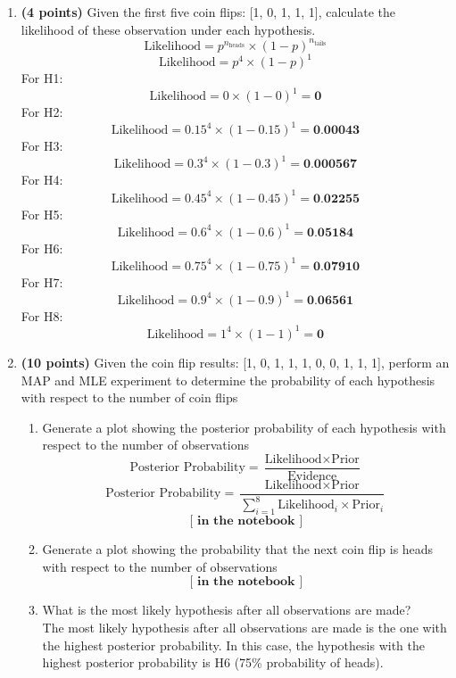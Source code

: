 \documentclass[a3paper,12pt]{extarticle} %
\begin{document}
    \begin{enumerate}
        \item \textbf{(4 points)} Given the first five coin flips: [1, 0, 1, 1, 1], calculate the likelihood of these observation
        under each hypothesis.
        \[
        \text{Likelihood} = p^{n_{\text{heads}}} \times (1-p)^{n_{\text{tails}}}
        \]
        \[
        \text{Likelihood} = p^{4} \times (1-p)^{1}
        \]
        For H1:
        \[
        \text{Likelihood} = 0 \times (1-0)^{1} = \textbf{0}
        \]
        For H2:
        \[
        \text{Likelihood} = 0.15^{4} \times (1-0.15)^{1} = \textbf{0.00043}
        \]
        For H3:
        \[
        \text{Likelihood} = 0.3^{4} \times (1-0.3)^{1} = \textbf{0.000567}
        \]
        For H4:
        \[
        \text{Likelihood} = 0.45^{4} \times (1-0.45)^{1} = \textbf{0.02255}
        \]
        For H5:
        \[
        \text{Likelihood} = 0.6^{4} \times (1-0.6)^{1} = \textbf{0.05184}
        \]
        For H6:
        \[
        \text{Likelihood} = 0.75^{4} \times (1-0.75)^{1} = \textbf{0.07910}
        \]
        For H7:
        \[
        \text{Likelihood} = 0.9^{4} \times (1-0.9)^{1} = \textbf{0.06561}
        \]
        For H8:
        \[
        \text{Likelihood} = 1^{4} \times (1-1)^{1} = \textbf{0}
        \]
        \item \textbf{(10 points)} Given the coin flip results: [1, 0, 1, 1, 1, 0, 0, 1, 1, 1], perform an MAP and MLE experiment
        to determine the probability of each hypothesis with respect to the number of coin flips
        \begin{enumerate}
            \item Generate a plot showing the posterior probability of each hypothesis with respect to the
            number of observations
            \[
            \text{Posterior Probability} = \frac{\text{Likelihood} \times \text{Prior}}{\text{Evidence}}
            \]
            \[
            \text{Posterior Probability} = \frac{\text{Likelihood} \times \text{Prior}}{\sum_{i=1}^{8}\text{Likelihood}_i \times \text{Prior}_i}
            \]
            \[
            \textbf{[ in the notebook ]}
            \]
            \item Generate a plot showing the probability that the next coin flip is heads with respect to the
            number of observations
            \[
            \textbf{[ in the notebook ]}
            \]
            \item What is the most likely hypothesis after all observations are made?
            \\ The most likely hypothesis after all observations are made is the one with the highest posterior probability. In this case, the hypothesis with the highest posterior probability is H6 (75\% probability of heads).
        \end{enumerate}
    \end{enumerate}
\end{document}
